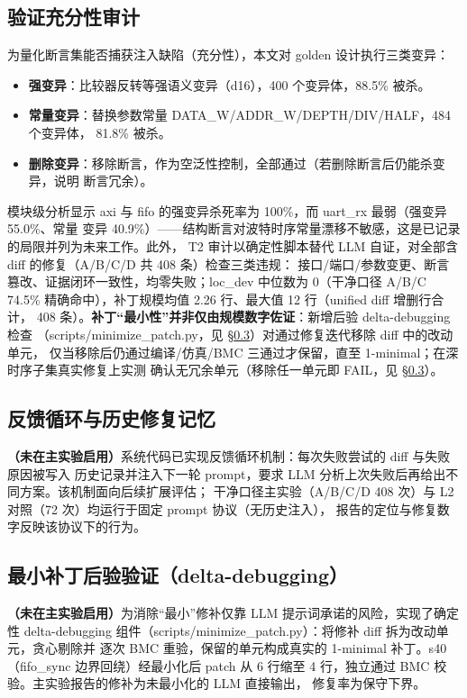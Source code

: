 \documentclass[twocolumn,10pt]{ctexart}
\begin{document}
\subsection{验证充分性审计}

为量化断言集能否捕获注入缺陷（充分性），本文对 golden 设计执行三类变异：
\begin{itemize}
\item \textbf{强变异}：比较器反转等强语义变异（d16），400 个变异体，88.5\% 被杀。
\item \textbf{常量变异}：替换参数常量 DATA\_W/ADDR\_W/DEPTH/DIV/HALF，484 个变异体，
81.8\% 被杀。
\item \textbf{删除变异}：移除断言，作为空泛性控制，全部通过（若删除断言后仍能杀变异，说明
断言冗余）。
\end{itemize}

模块级分析显示 axi 与 fifo 的强变异杀死率为 100\%，而 uart\_rx 最弱（强变异 55.0\%、常量
变异 40.9\%）——结构断言对波特时序常量漂移不敏感，这是已记录的局限并列为未来工作。此外，
T2 审计以确定性脚本替代 LLM 自证，对全部含 diff 的修复（A/B/C/D 共 408 条）检查三类违规：
接口/端口/参数变更、断言篡改、证据闭环一致性，均零失败；loc\_dev 中位数为 0（干净口径
A/B/C 74.5\% 精确命中），补丁规模均值 2.26 行、最大值 12 行（unified diff 增删行合计，
408 条）。\textbf{补丁“最小性”并非仅由规模数字佐证}：新增后验 delta-debugging 检查
（scripts/minimize\_patch.py，见 \S\ref{sec:minimality}）对通过修复迭代移除 diff 中的改动单元，
仅当移除后仍通过编译/仿真/BMC 三通过才保留，直至 1-minimal；在深时序子集真实修复上实测
确认无冗余单元（移除任一单元即 FAIL，见 \S\ref{sec:minimality}）。

\subsection{反馈循环与历史修复记忆}\label{sec:feedback}

\textbf{（未在主实验启用）}系统代码已实现反馈循环机制：每次失败尝试的 diff 与失败原因被写入
历史记录并注入下一轮 prompt，要求 LLM 分析上次失败后再给出不同方案。该机制面向后续扩展评估；
干净口径主实验（A/B/C/D 408 次）与 L2 对照（72 次）均运行于固定 prompt 协议（无历史注入），
报告的定位与修复数字反映该协议下的行为。

\subsection{最小补丁后验验证（delta-debugging）}\label{sec:minimality}

\textbf{（未在主实验启用）}为消除“最小”修补仅靠 LLM 提示词承诺的风险，实现了确定性
delta-debugging 组件（scripts/minimize\_patch.py）：将修补 diff 拆为改动单元，贪心剔除并
逐次 BMC 重验，保留的单元构成真实的 1-minimal 补丁。s40（fifo\_sync 边界回绕）经最小化后
patch 从 6 行缩至 4 行，独立通过 BMC 校验。主实验报告的修补为未最小化的 LLM 直接输出，
修复率为保守下界。
\end{document}
